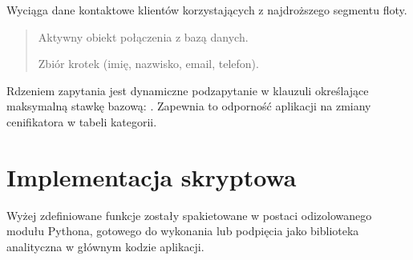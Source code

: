 \documentclass[a4paper,11pt,english,openany,oneside]{sphinxmanual}
\begin{document}
\begin{savenotes}\begin{fulllineitems}

\pysigstartsignatures
\pysiglinewithargsret
{}
{}
{}
\pysigstopsignatures
\sphinxAtStartPar
Wyciąga dane kontaktowe klientów korzystających z najdroższego segmentu floty.
\begin{quote}\begin{description}
\sphinxAtStartPar
{} \textendash{} Aktywny obiekt połączenia z bazą danych.

\sphinxAtStartPar
Zbiór krotek (imię, nazwisko, email, telefon).

\end{description}\end{quote}

\sphinxAtStartPar
{} Rdzeniem zapytania jest dynamiczne podzapytanie w klauzuli  określające maksymalną stawkę bazową: . Zapewnia to odporność aplikacji na zmiany cenifikatora w tabeli kategorii.

\end{fulllineitems}\end{savenotes}



\section{Implementacja skryptowa}
\label{\detokenize{rozdzial_5/index:implementacja-skryptowa}}
\sphinxAtStartPar
Wyżej zdefiniowane funkcje zostały spakietowane w postaci odizolowanego modułu Pythona, gotowego do wykonania lub podpięcia jako biblioteka analityczna w głównym kodzie aplikacji.
\end{document}

